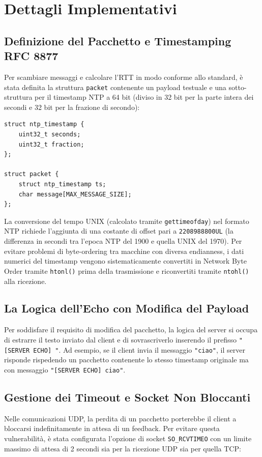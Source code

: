 \documentclass[12pt,a4paper,oneside]{article}
\begin{document}
\section{Dettagli Implementativi}

\subsection{Definizione del Pacchetto e Timestamping RFC 8877}
Per scambiare messaggi e calcolare l'RTT in modo conforme allo standard, è stata definita la struttura \texttt{packet} contenente un payload testuale e una sotto-struttura per il timestamp NTP a 64 bit (diviso in 32 bit per la parte intera dei secondi e 32 bit per la frazione di secondo):

\begin{lstlisting}[style=CStyle, caption={Definizione della struttura del pacchetto e dei timestamp conformi a RFC 8877}]
struct ntp_timestamp {
    uint32_t seconds;
    uint32_t fraction;
};

struct packet {
    struct ntp_timestamp ts;
    char message[MAX_MESSAGE_SIZE];
};
\end{lstlisting}

La conversione del tempo UNIX (calcolato tramite \texttt{gettimeofday}) nel formato NTP richiede l'aggiunta di una costante di offset pari a \texttt{2208988800UL} (la differenza in secondi tra l'epoca NTP del 1900 e quella UNIX del 1970). Per evitare problemi di byte-ordering tra macchine con diversa endianness, i dati numerici del timestamp vengono sistematicamente convertiti in Network Byte Order tramite \texttt{htonl()} prima della trasmissione e riconvertiti tramite \texttt{ntohl()} alla ricezione.

\subsection{La Logica dell'Echo con Modifica del Payload}
Per soddisfare il requisito di modifica del pacchetto, la logica del server si occupa di estrarre il testo inviato dal client e di sovrascriverlo inserendo il prefisso \texttt{"[SERVER ECHO] "}. Ad esempio, se il client invia il messaggio \texttt{"ciao"}, il server risponde rispedendo un pacchetto contenente lo stesso timestamp originale ma con messaggio \texttt{"[SERVER ECHO] ciao"}.

\subsection{Gestione dei Timeout e Socket Non Bloccanti}
Nelle comunicazioni UDP, la perdita di un pacchetto porterebbe il client a bloccarsi indefinitamente in attesa di un feedback. Per evitare questa vulnerabilità, è stata configurata l'opzione di socket \texttt{SO\_RCVTIMEO} con un limite massimo di attesa di 2 secondi sia per la ricezione UDP sia per quella TCP:
\end{document}
